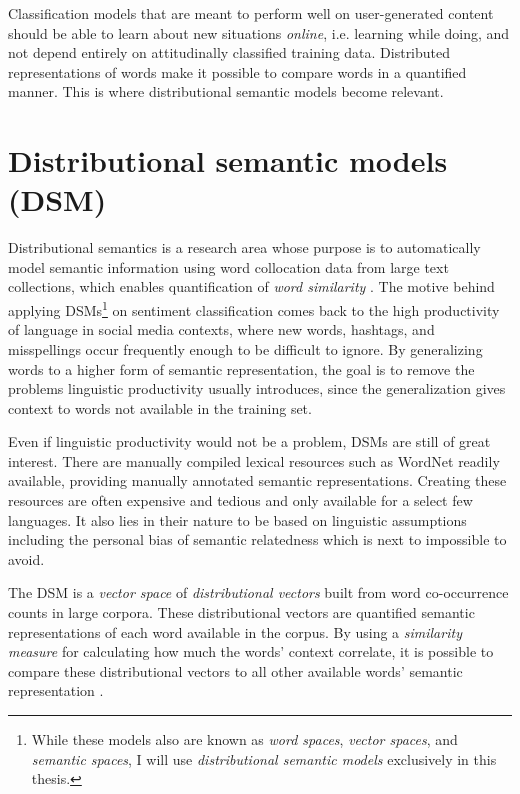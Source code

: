 Classification models that are meant to perform well on user-generated content should be able to learn about new situations \emph{online}, i.e. learning while doing, and not depend entirely on attitudinally classified training data. Distributed representations of words make it possible to compare words in a quantified manner. This is where distributional semantic models become relevant.

\section{Distributional semantic models (DSM)}
\label{background-distributional-semantics}


Distributional semantics is a research area whose purpose is to automatically model semantic information using word collocation data from large text collections, which enables quantification of \emph{word similarity} \parencite{Schuetze1993Word}. The motive behind applying DSMs\footnote{While these models also are known as \emph{word spaces}, \emph{vector spaces}, and \emph{semantic spaces}, I will use \emph{distributional semantic models} exclusively in this thesis.} on sentiment classification comes back to the high productivity of language in social media contexts, where new words, hashtags, and misspellings occur frequently enough to be difficult to ignore. By generalizing words to a higher form of semantic representation, the goal is to remove the problems linguistic productivity usually introduces, since the generalization gives context to words not available in the training set.

Even if linguistic productivity would not be a problem, DSMs are still of great interest. There are manually compiled lexical resources such as WordNet readily available, providing manually annotated semantic representations. Creating these resources are often expensive and tedious and only available for a select few languages. It also lies in their nature to be based on linguistic assumptions including the personal bias of semantic relatedness which is next to impossible to avoid.

The DSM is a \emph{vector space} of \emph{distributional vectors} built from word co-occurrence counts in large corpora. These distributional vectors are quantified semantic representations of each word available in the corpus. By using a \emph{similarity measure} for calculating how much the words' context correlate, it is possible to compare these distributional vectors to all other available words' semantic representation \parencite{Schuetze1993Word}.

